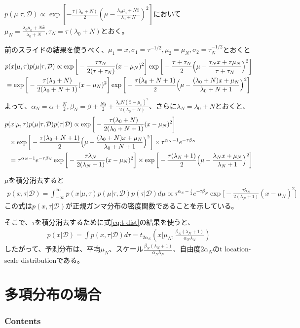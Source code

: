 \documentclass[aspectratio=169,unicode,dvipdfmx,14pt]{beamer}
\begin{document}
\begin{frame}
\FontMath
$p(\mu|\tau,\mathcal{D}) \propto \exp [ - \frac{\tau( \lambda_0 + N )}{2}  ( \mu - \frac{ \lambda_0 \mu_0 + N\bar{x} }{ \lambda_0 + N } )^2 ]$において$\mu_N = \frac{ \lambda_0 \mu_0 + N\bar{x} }{ \lambda_0 + N }, \tau_N = \tau(\lambda_0 + N)$とおく。

前のスライドの結果を使うべく、$\mu_1 = x, \sigma_1 = \tau^{-1/2}, \mu_2 = \mu_N, \sigma_2 = \tau_N^{-1/2}$とおくと
\begin{align}
& p(x|\mu,\tau) p(\mu|\tau,\mathcal{D})
\propto
\exp\bigg[ - \frac{ \tau\tau_N }{2(\tau + \tau_N)} (x - \mu_N)^2 \bigg]
\exp\bigg[ - \frac{ \tau + \tau_N }{2} \Big(\mu - \frac{ \tau_N x + \tau \mu_N }{ \tau + \tau_N }\Big)^2 \bigg]
\notag \\ & =
\exp\bigg[ - \frac{ \tau( \lambda_0 + N ) }{2(\lambda_0 + N + 1)} (x - \mu_N)^2 \bigg]
\exp\bigg[ - \frac{ \tau( \lambda_0 + N + 1 ) }{2} \Big(\mu - \frac{ ( \lambda_0 + N ) x + \mu_N }{ \lambda_0 + N + 1 }\Big)^2 \bigg]
\end{align}
よって、$\alpha_N=\alpha+\frac{N}{2}, \beta_N = \beta + \frac{Ns}{2} + \frac{ \lambda_0 N (\bar{x} - \mu_0)^2 }{ 2( \lambda_0 + N ) }$、さらに$\lambda_N = \lambda_0 + N$とおくと、
\begin{align}
& p(x|\mu,\tau) p(\mu|\tau,\mathcal{D})p(\tau|\mathcal{D})
\propto
\exp\bigg[ - \frac{ \tau( \lambda_0 + N ) }{2(\lambda_0 + N + 1)} (x - \mu_N)^2 \bigg]
\notag \\ & \mbox{ \ } \times
\exp\bigg[ - \frac{ \tau( \lambda_0 + N + 1 ) }{2} \Big(\mu - \frac{ ( \lambda_0 + N ) x + \mu_N }{ \lambda_0 + N + 1 }\Big)^2 \bigg] \times
\tau^{\alpha_N - 1} e^{ - \tau \beta_N }
\notag \\ & \mbox{ \ } = \tau^{\alpha_N - 1} e^{ - \tau \beta_N }
\exp\bigg[ - \frac{ \tau \lambda_N }{2(\lambda_N + 1)} (x - \mu_N)^2 \bigg]
\times \exp\bigg[ - \frac{ \tau( \lambda_N + 1 ) }{2} \Big(\mu - \frac{ \lambda_N x + \mu_N }{ \lambda_N + 1 }\Big)^2 \bigg]
\end{align}
\end{frame}

\begin{frame}
\FontMath
$\mu$を積分消去すると
\begin{align}
p(x, \tau|\mathcal{D})
= \int_{-\infty}^\infty p(x|\mu,\tau) p(\mu|\tau,\mathcal{D})p(\tau|\mathcal{D}) d\mu
\propto
\tau^{\alpha_N - \frac{1}{2}}
e^{ - \tau \beta_N } \exp\bigg[ - \frac{ \tau \lambda_N }{2(\lambda_N + 1)} (x - \mu_N)^2 \bigg]
\end{align}
この式は$p(x, \tau|\mathcal{D})$が正規ガンマ分布の密度関数であることを示している。

そこで、$\tau$を積分消去するために式\eqref{eq:t-dist}の結果を使うと、
\begin{align}
p(x|\mathcal{D}) = \int p(x, \tau|\mathcal{D}) d\tau
= t_{2\alpha_N} ( x | \mu_N, \frac{\beta_N(\lambda_N + 1)}{\alpha_N\lambda_N} ) 
\end{align}
したがって、予測分布は、平均$\mu_N$、スケール$\frac{\beta_N(\lambda_N + 1)}{\alpha_N\lambda_N}$、自由度$2\alpha_N$のt location-scale distributionである。
\end{frame}

\section{多項分布の場合}

\begin{frame}\frametitle{Contents}
\Large \tableofcontents[currentsection]
\end{frame}
\end{document}
